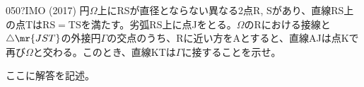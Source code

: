 \begin{thm}{050}{\hosi ?}{IMO (2017)}
 円$\Omega$上にRSが直径とならない異なる2点R, Sがあり、直線RS上の点TはRS$=$TSを満たす。劣弧RS上に点Jをとる。$\Omega$のRにおける接線と$\triangle\mr{JST}$の外接円$\Gamma$の交点のうち、Rに近い方をAとすると、直線AJは点Kで再び$\Omega$と交わる。このとき、直線KTは$\Gamma$に接することを示せ。
\end{thm}

ここに解答を記述。